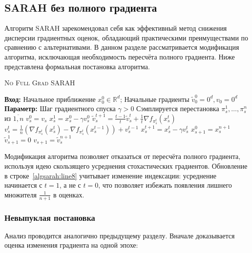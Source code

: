 \subsection{SARAH без полного градиента}\label{subsection:sarahalgorithm}

Алгоритм \textsc{SARAH} зарекомендовал себя как эффективный метод снижения дисперсии градиентных оценок, обладающий практическими преимуществами по сравнению с альтернативами. В данном разделе рассматривается модификация алгоритма, исключающая необходимость пересчёта полного градиента. Ниже представлена формальная постановка алгоритма.

\begin{algorithm}[H]
\caption{\textsc{No Full Grad SARAH}}\label{alg:sarah}
\begin{algorithmic}[1]
    \State \textbf{Вход:} Начальное приближение $x_0^0\in\mathbb{R}^d$; Начальные градиенты $\widetilde{v}_0^0 = 0^d, v_0 = 0^d$
    \State \textbf{Параметр:} Шаг градиентного спуска $\gamma > 0$
    \State Сэмплируется перестановка $\pi^1_s, \dots, \pi^{n}_s$  из $\overline{1, n}$ 
    \State $v_s^0 = v_s$
    \State $x_s^1 = x_s^0 - \gamma v_s^0$
    \State \label{algsarah:line8} $\widetilde{v}_s^{t+1} = \frac{t-1}{t} \widetilde{v}_s^{t} + \frac{1}{t} \nabla f_{\pi_s^t}(x_s^t)$
    \State \label{algsarah:line9} $v_s^{t} = \frac{1}{n}\left(\nabla f_{\pi_s^t}(x_s^t) - \nabla f_{\pi_s^t}(x_s^{t-1})\right) + v_s^{t-1}$
    \State \label{algsarah:line10} $x_s^{t+1} = x_s^t - \gamma v_s^t$
    \EndFor
    \State $x_{s+1}^0 = x_s^{n+1}$
    \State $\widetilde{v}_{s+1}^1 = 0$
    \State $v_{s+1} = \widetilde{v}_s^{n+1}$
    \EndFor
\end{algorithmic}
\end{algorithm}

Модификация алгоритма позволяет отказаться от пересчёта полного градиента, используя идею скользящего усреднения стохастических градиентов. Обновление в строке~\ref{algsarah:line8} учитывает изменение индексации: усреднение начинается с $t=1$, а не с $t=0$, что позволяет избежать появления лишнего множителя \(\frac{1}{n+1}\) в оценках.

\subsubsection{Невыпуклая постановка}\label{subsection:sarahnonconvex}

Анализ проводится аналогично предыдущему разделу. Вначале доказывается оценка изменения градиента на одной эпохе:

